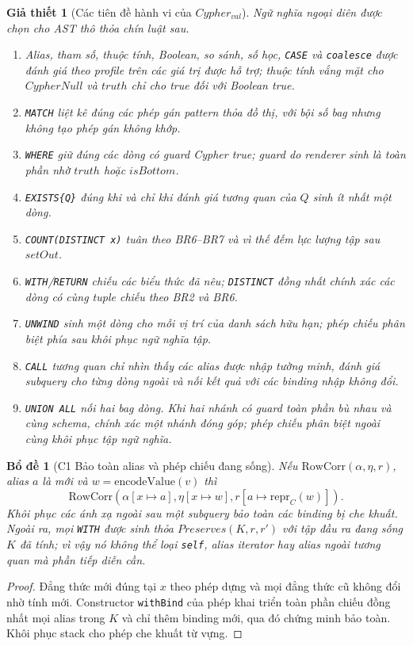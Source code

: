 \documentclass[11pt,a4paper]{article}
\newtheorem{lemma}{Bổ đề}
\newtheorem{assumption}{Giả thiết}
\theoremstyle{definition}
\newcommand{\encodeValue}{\mathrm{encodeValue}}
\newcommand{\RowCorr}{\mathrm{RowCorr}}
\newcommand{\reprC}{\mathrm{repr}_{C}}
\begin{document}
\begin{assumption}[Các tiên đề hành vi của $Cypher_{val}$]
Ngữ nghĩa ngoại diên được chọn cho AST thô thỏa chín luật sau.
\begin{enumerate}[label=(CY\arabic*)]
  \item Alias, tham số, thuộc tính, Boolean, so sánh, số học,
  \texttt{CASE} và \texttt{coalesce} được đánh giá theo profile trên các giá
  trị được hỗ trợ; thuộc tính vắng mặt cho $CypherNull$ và $truth$ chỉ cho true
  đối với Boolean true.
  \item \texttt{MATCH} liệt kê đúng các phép gán pattern thỏa đồ thị, với bội
  số bag nhưng không tạo phép gán không khớp.
  \item \texttt{WHERE} giữ đúng các dòng có guard Cypher true; guard do
  renderer sinh là toàn phần nhờ $truth$ hoặc $isBottom$.
  \item \texttt{EXISTS\{Q\}} đúng khi và chỉ khi đánh giá tương quan của $Q$
  sinh ít nhất một dòng.
  \item \texttt{COUNT(DISTINCT x)} tuân theo BR6--BR7 và vì thế đếm lực lượng
  tập sau $setOut$.
  \item \texttt{WITH}/\texttt{RETURN} chiếu các biểu thức đã nêu;
  \texttt{DISTINCT} đồng nhất chính xác các dòng có cùng tuple chiếu theo BR2
  và BR6.
  \item \texttt{UNWIND} sinh một dòng cho mỗi vị trí của danh sách hữu hạn;
  phép chiếu phân biệt phía sau khôi phục ngữ nghĩa tập.
  \item \texttt{CALL} tương quan chỉ nhìn thấy các alias được nhập tường minh,
  đánh giá subquery cho từng dòng ngoài và nối kết quả với các binding nhập
  không đổi.
  \item \texttt{UNION ALL} nối hai bag dòng. Khi hai nhánh có guard toàn phần
  bù nhau và cùng schema, chính xác một nhánh đóng góp; phép chiếu phân biệt
  ngoài cùng khôi phục tập ngữ nghĩa.
\end{enumerate}
\end{assumption}

\begin{lemma}[C1 Bảo toàn alias và phép chiếu đang sống]
Nếu $\RowCorr(\alpha,\eta,r)$, alias $a$ là mới và
$w=\encodeValue(v)$ thì
\[
\RowCorr(\alpha[x\mapsto a],\eta[x\mapsto w],r[a\mapsto\reprC(w)]).
\]
Khôi phục các ánh xạ ngoài sau một subquery bảo toàn các binding bị che khuất.
Ngoài ra, mọi \texttt{WITH} được sinh thỏa $Preserves(K,r,r')$ với tập đầu ra
đang sống $K$ đã tính; vì vậy nó không thể loại \texttt{self}, alias iterator
hay alias ngoài tương quan mà phần tiếp diễn cần.
\end{lemma}
\begin{proof}
Đẳng thức mới đúng tại $x$ theo phép dựng và mọi đẳng thức cũ không đổi nhờ
tính mới. Constructor \texttt{withBind} của phép khai triển toàn phần chiếu
đồng nhất mọi alias trong $K$ và chỉ thêm binding mới, qua đó chứng minh bảo
toàn. Khôi phục stack cho phép che khuất từ vựng.
\end{proof}
\end{document}
